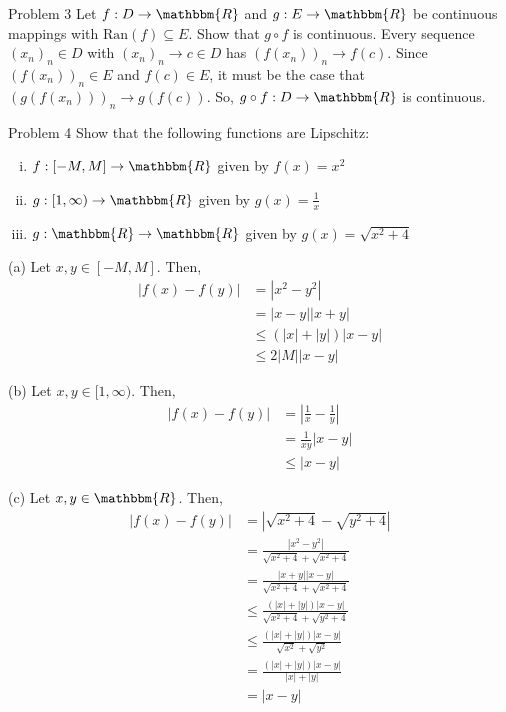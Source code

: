 \documentclass[8pt]{extarticle}
\newcommand{\ran}{\text{Ran}}
\newcommand{\R}{\mathbbm{R}}
\begin{document}
  \begin{problem}{Problem 3}
    Let $f: D\rightarrow \R$ and $g: E\rightarrow \R$ be continuous mappings with $\ran(f)\subseteq E$. Show that $g\circ f$ is continuous.
    \tcblower
    Every sequence $(x_n)_n\in D$ with $(x_n)_n \rightarrow c\in D$ has $(f(x_n))_n \rightarrow f(c)$. Since $(f(x_n))_n \in E$ and $f(c)\in E$, it must be the case that $(g(f(x_n)))_n \rightarrow g(f(c))$. So, $g\circ f: D\rightarrow \R$ is continuous.
  \end{problem}
  \begin{problem}{Problem 4}
    Show that the following functions are Lipschitz:
    \begin{enumerate}[(i)]
      \item $f: [-M,M] \rightarrow \R$ given by $f(x) = x^2$
      \item $g: [1,\infty)\rightarrow \R$ given by $g(x) = \frac{1}{x}$
      \item $g: \R \rightarrow \R$ given by $g(x) = \sqrt{x^2 + 4}$
    \end{enumerate}
    \tcblower
    \begin{problem}{(a)}
      Let $x,y\in [-M,M]$. Then,
      \begin{align*}
        |f(x) - f(y)| &= |x^2 - y^2|\\
                      &= |x-y||x+y|\\
                      &\leq \left(|x| + |y|\right)|x-y|\\
                      &\leq 2|M||x-y|
      \end{align*}
    \end{problem}
    \begin{problem}{(b)}
      Let $x,y\in [1,\infty)$. Then,
      \begin{align*}
        |f(x) - f(y)| &= \left|\frac{1}{x} - \frac{1}{y}\right|\\
                      &= \frac{1}{xy}|x-y|\\
                      &\leq |x-y|
      \end{align*}
    \end{problem}
    \begin{problem}{(c)}
      Let $x,y\in \R$. Then,
      \begin{align*}
        |f(x) - f(y)| &= |\sqrt{x^2 + 4} - \sqrt{y^2 + 4}|\\
                      &= \frac{|x^2 - y^2|}{\sqrt{x^2 + 4} + \sqrt{x^2 + 4}}\\
                      &= \frac{|x+y||x-y|}{\sqrt{x^2 + 4} + \sqrt{x^2 + 4}}\\
                      &\leq \frac{(|x| + |y|)|x-y|}{\sqrt{x^2+4} + \sqrt{y^2+4}}\\
                      &\leq \frac{(|x| + |y|)|x-y|}{\sqrt{x^2} + \sqrt{y^2}}\\
                      &= \frac{\left(|x| + |y|\right)|x-y|}{|x| + |y|} \\
                      &= |x-y|
      \end{align*}
    \end{problem}
  \end{problem}
\end{document}
